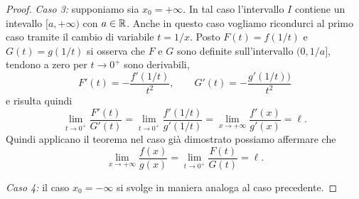 \begin{proof}
\emph{Caso 3:} supponiamo sia $x_0=+\infty$. In tal caso
l'intervallo $I$ contiene un intevallo $[a,+\infty)$ con $a\in{\mathbb R}$.
Anche in questo caso vogliamo ricondurci al primo caso tramite il cambio
di variabile $t=1/x$. Posto $F(t) = f(1/t)$ e $G(t)= g(1/t)$ si osserva che $F$ e $G$
sono definite sull'intervallo $(0,1/a]$,
tendono a zero per $t\to 0^+$
sono derivabili,
\[
  F'(t) = -\frac{f'(1/t)}{t^2}, \qquad
  G'(t) = -\frac{g'(1/t))}{t^2}
\]
e risulta quindi
\[
  \lim_{t\to 0^+} \frac{F'(t)}{G'(t)}
  = \lim_{t\to 0^+} \frac{f'(1/t)}{g'(1/t)}
  = \lim_{x\to +\infty} \frac{f'(x)}{g'(x)} = \ell.
\]
Quindi applicano il teorema nel caso già dimostrato possiamo affermare che
\[
  \lim_{x\to +\infty} \frac{f(x)}{g(x)} = \lim_{t\to 0^+} \frac{F(t)}{G(t)} = \ell.
\]

\emph{Caso 4:} il caso $x_0 = -\infty$ si svolge in maniera analoga al caso precedente.
\end{proof}

